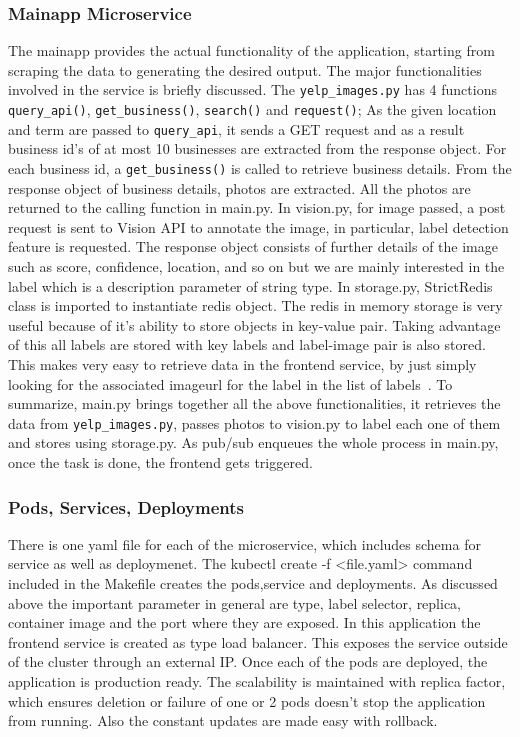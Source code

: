 \subsubsection{Mainapp Microservice} 


The mainapp provides the actual functionality of the application,
starting from scraping the data to generating the desired output. The
major functionalities involved in the service is briefly discussed.
The \verb|yelp_images.py| has 4 functions \verb|query_api()|,
\verb|get_business()|, \verb|search()| and \verb|request()|; As the given location
and term are passed to \verb|query_api|, it sends a GET request and as a
result business id’s of at most 10 businesses are extracted from the
response object. For each business id, a \verb|get_business()| is called
to retrieve business details. From the response object of business
details, photos are extracted. All the photos are returned to the
calling function in main.py.  In vision.py, for image passed, a
post request is sent to Vision API to annotate the image, in
particular, label detection feature is requested. The response object
consists of further details of the image such as score, confidence,
location, and so on but we are mainly interested in the label which is
a description parameter of string type. In storage.py, StrictRedis
class is imported to instantiate redis object. The redis in memory
storage is very useful because of it’s ability to store objects in
key-value pair. Taking advantage of this all labels are stored with
key labels and label-image pair is also stored. This makes very easy
to retrieve data in the frontend service, by just simply looking for
the associated imageurl for the label in the list of
labels~\cite{hid-sp18-602-redis-implementation}.  To summarize,
main.py brings together all the above functionalities, it retrieves
the data from \verb|yelp_images.py|, passes photos to vision.py to label
each one of them and stores using storage.py. As pub/sub enqueues
the whole process in main.py, once the task is done, the frontend
gets triggered.
  
\subsubsection{Pods, Services, Deployments} 

There is one yaml file for each of the microservice, which includes
schema for service as well as deploymenet. The
kubectl create -f <file.yaml> command included in the Makefile
creates the pods,service and deployments. As discussed above the
important parameter in general are type, label selector, replica,
container image and the port where they are exposed.  In this
application the frontend service is created as type load
balancer. This exposes the service outside of the cluster through an
external IP. Once each of the pods are deployed, the application is
production ready. The scalability is maintained with replica factor,
which ensures deletion or failure of one or 2 pods doesn’t stop the
application from running. Also the constant updates are made easy with
rollback.
  
